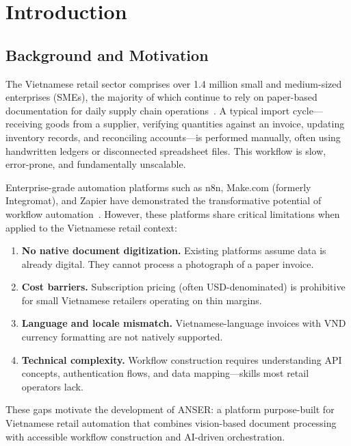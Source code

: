 \documentclass[11pt,a4paper]{report}
\begin{document}
\cleardoublepage
{}

\chapter{Introduction}
\label{ch:intro}

\section{Background and Motivation}

The Vietnamese retail sector comprises over 1.4 million small and medium-sized enterprises (SMEs), the majority of which continue to rely on paper-based documentation for daily supply chain operations~\cite{gso2023}. A typical import cycle---receiving goods from a supplier, verifying quantities against an invoice, updating inventory records, and reconciling accounts---is performed manually, often using handwritten ledgers or disconnected spreadsheet files. This workflow is slow, error-prone, and fundamentally unscalable.

Enterprise-grade automation platforms such as n8n, Make.com (formerly Integromat), and Zapier have demonstrated the transformative potential of workflow automation~\cite{n8n,makecom,zapier}. However, these platforms share critical limitations when applied to the Vietnamese retail context:

\begin{enumerate}
  \item \textbf{No native document digitization.} Existing platforms assume data is already digital. They cannot process a photograph of a paper invoice.
  \item \textbf{Cost barriers.} Subscription pricing (often USD-denominated) is prohibitive for small Vietnamese retailers operating on thin margins.
  \item \textbf{Language and locale mismatch.} Vietnamese-language invoices with VND currency formatting are not natively supported.
  \item \textbf{Technical complexity.} Workflow construction requires understanding API concepts, authentication flows, and data mapping---skills most retail operators lack.
\end{enumerate}

These gaps motivate the development of ANSER: a platform purpose-built for Vietnamese retail automation that combines vision-based document processing with accessible workflow construction and AI-driven orchestration.
\end{document}
